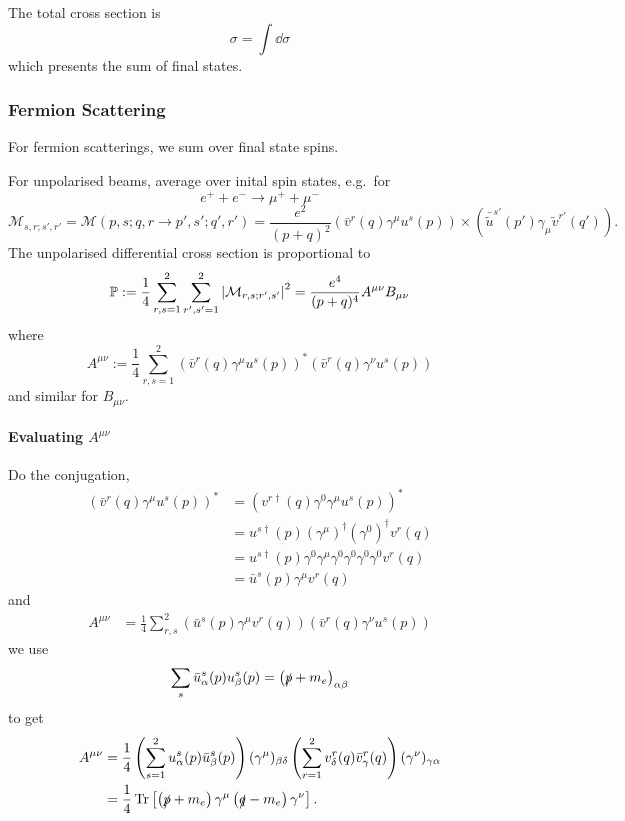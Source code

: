\documentclass[a4paper,11pt]{article}
\begin{document}
	The total cross section is
	\[
		\sigma = \int \dd{\sigma}
	\]
	which presents the sum of final states.

	\subsubsection{Fermion Scattering}
	For fermion scatterings, we sum over final state spins.	
	
	For unpolarised beams, average over inital spin states, e.g.\ for 
	\[
		e^+ + e^- \to \mu^+ + \mu^-
	\]
	\[
		\mathcal{M}_{s,r;s',r'} = \mathcal{M}(p,s;q,r \to p',s';q',r') = \frac{e^2}{(p+q)^2} (\bar v^r(q) \gamma^\mu u^s(p)) \times (\bar{\tilde u}^{s'}(p')\gamma_\mu \tilde v ^{r'}(q')).
	\]
	The unpolarised differential cross section is proportional to 
	\[
		\mathbb{P} := \frac{1}{4} \sum _{r,s = 1}^2 \sum _{r',s'=1}^2\abs{\mathcal{M}_{r,s;r',s'}}^2 = \frac{e^4}{(p + q)^4} A ^{\mu \nu} B _{\mu \nu}
	\]
	where 
	\[
		A ^{\mu \nu} := \frac{1}{4} \sum _{r,s = 1}^2 (\bar v^r (q) \gamma^\mu u^s(p))^*(\bar v^r (q) \gamma^\nu u^s(p))
	\]
	and similar for $B _{\mu \nu}$.

	\paragraph{Evaluating $A ^{\mu \nu}$}
	Do the conjugation,
	\begin{align*}
		(\bar v^r (q) \gamma^\mu u^s(p))^* &= (v^{r\dagger} (q) \gamma^0 \gamma^\mu u^s(p))^*\\
		& = u^{s\dagger}(p) (\gamma^\mu)^{\dagger} (\gamma^0)^{\dagger} v^r(q)\\
		& = u^{s\dagger}(p) \gamma^0 \gamma^\mu \gamma^0 \gamma^0 \gamma^0 \gamma^0 v^r(q)\\
		& = \bar u^s(p) \gamma^\mu v^r(q)
	\end{align*}
	and
	\begin{align*}
		A ^{\mu \nu} & = \frac{1}{4} \sum _{r,s}^2 (\bar u^s(p) \gamma^\mu v^r(q)) (\bar v^r(q) \gamma^\nu u^s(p))
	\end{align*}
	we use 
	\[
		\sum_s \bar u^s_\alpha(p) u^s_\beta(p) = \left(\slashed{p} + m_e\right) _{\alpha \beta}
	\]
	to get 
	\begin{align*}
		A ^{\mu \nu} & = \frac{1}{4} \left( \sum _{s = 1}^2 u^s_\alpha(p) \bar u^s_\beta(p) \right) (\gamma^\mu)_{\beta \delta} \left( \sum _{r = 1}^2 v^r_\delta(q) \bar v^r_\gamma(q) \right) (\gamma^\nu)_{\gamma \alpha}\\
		& = \frac{1}{4} \Tr\left[ \left( \slashed{p} + m_e \right) \gamma^\mu \left( \slashed{q} - m_e \right) \gamma^\nu \right].
	\end{align*}
	
\end{document}
